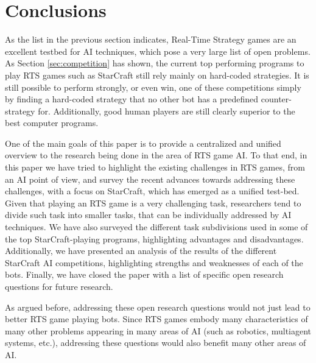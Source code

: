 \documentclass[journal]{IEEEtran}
\begin{document}
%

\section{Conclusions}\label{sec:conclusions}

As the list in the previous section indicates, Real-Time Strategy games are an excellent testbed for AI techniques, which pose a very large list of open problems. As Section \ref{sec:competition} has shown, the current top performing programs to play RTS games such as StarCraft still rely mainly on hard-coded strategies. It is still possible to perform strongly, or even win, one of these competitions simply by finding a hard-coded strategy that no other bot has a predefined counter-strategy for. Additionally, good human players are still clearly superior to the best computer programs.

One of the main goals of this paper is to provide a centralized and unified overview to the research being done in the area of RTS game AI. To that end, in this paper we have tried to highlight the existing challenges in RTS games, from an AI point of view, and survey the recent advances towards addressing these challenges, with a focus on StarCraft, which has emerged as a unified test-bed. Given that playing an RTS game is a very challenging task, researchers tend to divide such task into smaller tasks, that can be individually addressed by AI techniques. We have also surveyed the different task subdivisions used in some of the top StarCraft-playing programs, highlighting advantages and disadvantages. Additionally, we have presented an analysis of the results of the different StarCraft AI competitions, highlighting strengths and weaknesses of each of the bots. Finally, we have closed the paper with a list of specific open research questions for future research.

As argued before, addressing these open research questions would not just lead to better RTS game playing bots. Since RTS games embody many characteristics of many other problems appearing in many areas of AI (such as robotics, multiagent systems, etc.), addressing these questions would also benefit many other areas of AI. 
\end{document}
